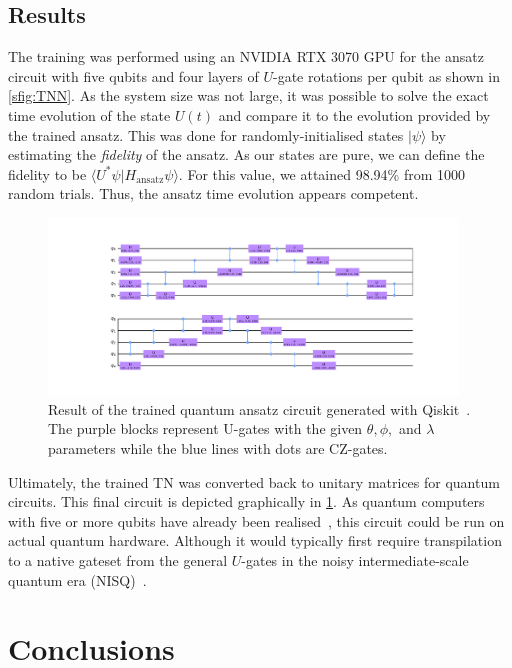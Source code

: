 \subsection{Results}

The training was performed using an NVIDIA RTX 3070 GPU for the ansatz circuit with five qubits and four layers of $U$-gate rotations per qubit as shown in \cref{sfig:TNN}.
As the system size was not large, it was possible to solve the exact time evolution of the state $U(t)$ and compare it to the evolution provided by the trained ansatz. This was done for randomly-initialised states $|\psi\rangle$ by estimating the \emph{fidelity} of the ansatz. As our states are pure, we can define the fidelity to be $\langle U^* \psi | H_\text{ansatz} \psi \rangle$. For this value, we attained 98.94\% from 1000 random trials. Thus, the ansatz time evolution appears competent.

\begin{figure}[htb]
    \centering
    \includegraphics[width=0.97\textwidth]{figures/ansatz_circuit.pdf}
    \caption{Result of the trained quantum ansatz circuit generated with Qiskit~\cite{Qiskit}. The purple blocks represent U-gates with the given $\theta, \phi,$ and $\lambda$ parameters while the blue lines with dots are CZ-gates.}
    \label{fig:qasm_circuit}
\end{figure}

Ultimately, the trained TN was converted back to unitary matrices for quantum circuits. This final circuit is depicted graphically in \cref{fig:qasm_circuit}. As quantum computers with five or more qubits have already been realised~\cite{VTT-IQM}, this circuit could be run on actual quantum hardware. Although it would typically first require transpilation to a native gateset from the general $U$-gates in the noisy inter\-mediate-scale quantum era (NISQ)~\cite{Wilson2020,Li2020}.


\newpage
\section{Conclusions}

